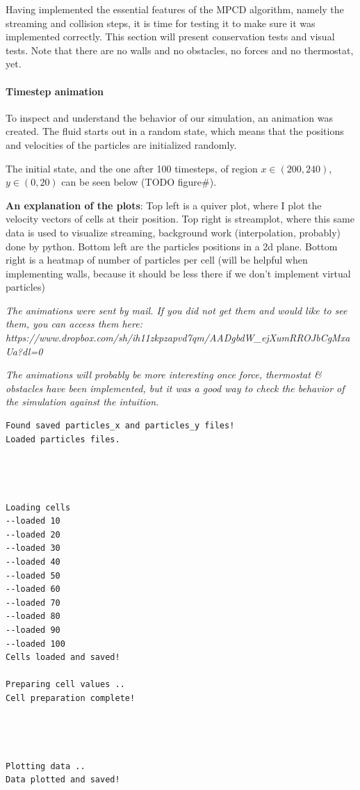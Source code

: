 \documentclass[
]{article}
\begin{document}
Having implemented the essential features of the MPCD algorithm, namely
the streaming and collision steps, it is time for testing it to make
sure it was implemented correctly. This section will present
conservation tests and visual tests. Note that there are no walls and no
obstacles, no forces and no thermostat, yet.

\hypertarget{timestep-animation}{%
\paragraph{Timestep animation}\label{timestep-animation}}

To inspect and understand the behavior of our simulation, an animation
was created. The fluid starts out in a random state, which means that
the positions and velocities of the particles are initialized randomly.

The initial state, and the one after 100 timesteps, of region
\(x \in (200, 240)\), \(y \in (0, 20)\) can be seen below (TODO
figure\#).

\textbf{An explanation of the plots}: Top left is a quiver plot, where I
plot the velocity vectors of cells at their position. Top right is
streamplot, where this same data is used to visualize streaming,
background work (interpolation, probably) done by python. Bottom left
are the particles positions in a 2d plane. Bottom right is a heatmap of
number of particles per cell (will be helpful when implementing walls,
because it should be less there if we don't implement virtual particles)

\emph{The animations were sent by mail. If you did not get them and
would like to see them, you can access them here:
https://www.dropbox.com/sh/ih11zkpzapvd7qm/AADgbdW\_ejXumRROJbCgMxaUa?dl=0}

\emph{The animations will probably be more interesting once force,
thermostat \& obstacles have been implemented, but it was a good way to
check the behavior of the simulation against the intuition.}

\begin{verbatim}
Found saved particles_x and particles_y files!
Loaded particles files.




Loading cells
--loaded 10
--loaded 20
--loaded 30
--loaded 40
--loaded 50
--loaded 60
--loaded 70
--loaded 80
--loaded 90
--loaded 100
Cells loaded and saved!

Preparing cell values ..
Cell preparation complete!




Plotting data ..
Data plotted and saved!
\end{verbatim}
\end{document}
